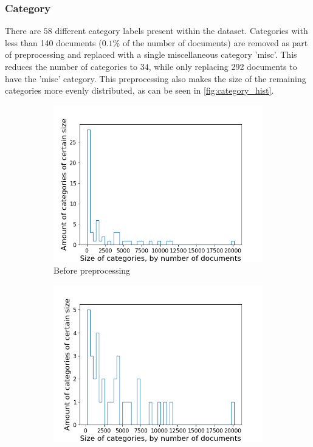 \subsubsection{Category}\label{subsec:appendix_category}
There are $58$ different category labels present within the dataset.
Categories with less than 140 documents ($0.1\%$ of the number of documents) are removed as part of preprocessing and replaced with a single miscellaneous category 'misc'.
This reduces the number of categories to $34$, while only replacing 292 documents to have the 'misc' category.
This preprocessing also makes the size of the remaining categories more evenly distributed, as can be seen in \autoref{fig:category_hist}.

\begin{figure}[ht]
	\centering
	\begin{subfigure}{0.45\textwidth}
		\centering
		\includegraphics[width=\linewidth]{figures/category_hist2_before.png}
		\caption{Before preprocessing}
		\label{fig:category_hist_before}
	\end{subfigure}
	\begin{subfigure}{0.45\textwidth}
		\centering
		\includegraphics[width=\linewidth]{figures/category_hist2_140.png}

\end{subfigure}
\end{figure}
